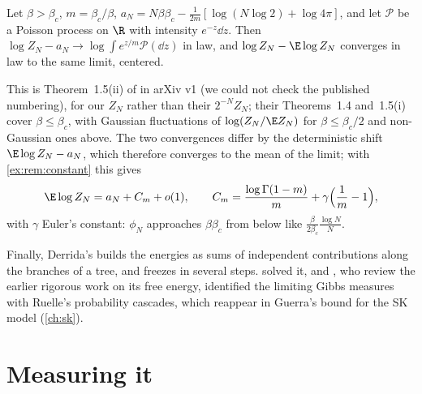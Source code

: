 \begin{refsection}
\begin{theorem}\label{thm:rem:fluct}
Let $\beta>\beta_c$, $m=\beta_c/\beta$, $a_N=N\beta\beta_c-\frac1{2m}[\log(N\log2)+\log4\pi]$, and let $\mathcal P$ be a Poisson process on $\R$ with intensity $e^{-z}\dd z$. Then $\log Z_N-a_N\to\log\int e^{z/m}\mathcal P(\dd z)$ in law, and $\log Z_N-\E\log Z_N$ converges in law to the same limit, centered.
\end{theorem}

This is Theorem~1.5(ii) of \textcite{BovierKurkovaLowe2002} in arXiv v1 (we could not check the published numbering), for our $Z_N$ rather than their $2^{-N}Z_N$; their Theorems~1.4 and~1.5(i) cover $\beta\le\beta_c$, with Gaussian fluctuations of $\log(Z_N/\E Z_N)$ for $\beta\le\beta_c/2$ and non-Gaussian ones above. The two convergences differ by the deterministic shift $\E\log Z_N-a_N$, which therefore converges to the mean of the limit; with \cref{ex:rem:constant} this gives
\begin{equation}\label{eq:rem:finitesize}
\E\log Z_N=a_N+C_m+o(1),\qquad C_m=\frac{\log\Gamma(1-m)}m+\gamma\Bigl(\frac1m-1\Bigr),
\end{equation}
with $\gamma$ Euler's constant: $\phi_N$ approaches $\beta\beta_c$ from below like $\frac{\beta}{2\beta_c}\frac{\log N}N$.

Finally, Derrida's  \parencite{Derrida1985} builds the energies as sums of independent contributions along the branches of a tree, and freezes in several steps. \Textcite{DerridaGardner1986} solved it, and \textcite{BovierKurkova2004}, who review the earlier rigorous work on its free energy, identified the limiting Gibbs measures with Ruelle's probability cascades, which reappear in Guerra's bound for the SK model (\cref{ch:sk}).

\section{Measuring it}\label{sec:rem:measuring}


\end{refsection}
